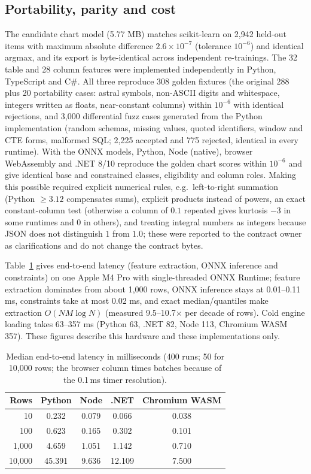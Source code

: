 \documentclass[11pt]{article}
\begin{document}
\subsection{Portability, parity and cost}
The candidate chart model (5.77 MB) matches scikit-learn on 2{,}942 held-out items with maximum absolute difference $2.6\times10^{-7}$ (tolerance $10^{-6}$) and identical argmax, and its export is byte-identical across independent re-trainings. The 32 table and 28 column features were implemented independently in Python, TypeScript and C\#. All three reproduce 308 golden fixtures (the original 288 plus 20 portability cases: astral symbols, non-ASCII digits and whitespace, integers written as floats, near-constant columns) within $10^{-6}$ with identical rejections, and 3{,}000 differential fuzz cases generated from the Python implementation (random schemas, missing values, quoted identifiers, window and CTE forms, malformed SQL; 2{,}225 accepted and 775 rejected, identical in every runtime). With the ONNX models, Python, Node (native), browser WebAssembly and .NET 8/10 reproduce the golden chart scores within $10^{-6}$ and give identical base and constrained classes, eligibility and column roles. Making this possible required explicit numerical rules, e.g.\ left-to-right summation (Python $\geq 3.12$ compensates sums), explicit products instead of powers, an exact constant-column test (otherwise a column of $0.1$ repeated gives kurtosis $-3$ in some runtimes and $0$ in others), and treating integral numbers as integers because JSON does not distinguish $1$ from $1.0$; these were reported to the contract owner as clarifications and do not change the contract bytes.

Table~\ref{tab:cost} gives end-to-end latency (feature extraction, ONNX inference and constraints) on one Apple M4 Pro with single-threaded ONNX Runtime; feature extraction dominates from about 1{,}000 rows, ONNX inference stays at 0.01--0.11 ms, constraints take at most 0.02 ms, and exact median/quantiles make extraction $O(NM\log N)$ (measured 9.5--10.7$\times$ per decade of rows). Cold engine loading takes 63--357 ms (Python 63, .NET 82, Node 113, Chromium WASM 357). These figures describe this hardware and these implementations only.
\begin{table}[h]\centering\small
\begin{tabular}{rcccc}\toprule
Rows & Python & Node & .NET & Chromium WASM\\\midrule
10 & 0.232 & 0.079 & 0.066 & 0.038\\
100 & 0.623 & 0.165 & 0.302 & 0.101\\
1{,}000 & 4.659 & 1.051 & 1.142 & 0.710\\
10{,}000 & 45.391 & 9.636 & 12.109 & 7.500\\\bottomrule
\end{tabular}
\caption{Median end-to-end latency in milliseconds (400 runs; 50 for 10{,}000 rows; the browser column times batches because of the 0.1\,ms timer resolution).}\label{tab:cost}
\end{table}
\end{document}
